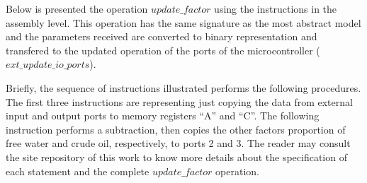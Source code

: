 
Below is presented the operation $\textit{update\_factor}$ using the instructions
in the assembly level. This operation has the same signature as the most
abstract model and the parameters received are converted to binary representation and
transfered to the updated operation of the ports of the microcontroller
($\textit{ext\_update\_io\_ports}$).

Briefly, the sequence of instructions illustrated performs the following
procedures. The first three instructions are representing just copying the data
from external input and output ports to memory registers ``A'' and ``C''. The
following instruction performs a subtraction, then copies the other factors
proportion of free water and crude oil, respectively, to ports 2 and 3. The
reader may consult the site repository of this work to know more details about the
specification of each statement and the complete $\textit{update\_factor}$
operation.
   
